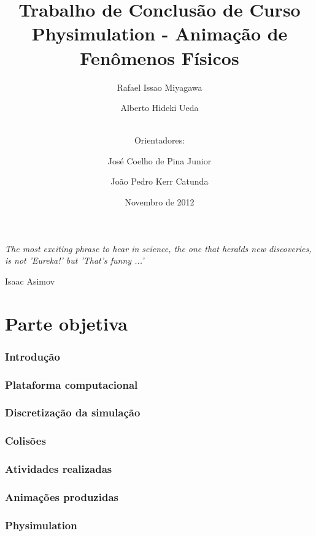 \documentclass[a4paper,12pt,titlepage]{article}
\title{Trabalho de Conclusão de Curso \\
Physimulation - Animação de Fenômenos Físicos}
\author{Rafael Issao Miyagawa \and Alberto Hideki Ueda \\ \ \and  
	Orientadores: \and
	José Coelho de Pina Junior \and  João Pedro Kerr Catunda }
\date{Novembro de 2012}
\begin{document}
\maketitle

\vspace*{\fill}
\epigraph{\it The most exciting phrase to hear in science, the one that heralds new discoveries, is not 'Eureka!' but 'That's funny ...'}{Isaac Asimov}
\newpage

\tableofcontents
\pagebreak

\part{Parte objetiva}

\section{Introdução} \label{introducao}

\newpage

\section{Plataforma computacional} \label{plataforma}

\newpage

\section{Discretização da simulação} \label{discretizacao}

\newpage

\section{Colisões} \label{colisoes}

\newpage

\section{Atividades realizadas} \label{atividades}

\newpage

\section{Animações produzidas} \label{animacoes}

\newpage

\section{Physimulation} \label{physimulation}

\newpage
\end{document}
